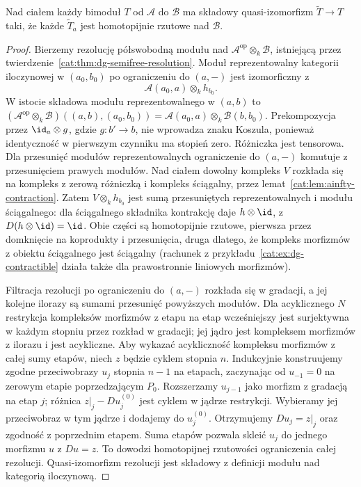 \begin{lemat}\label{cat:lem:morita-bimodule-resolution}
Nad ciałem każdy bimoduł $T$ od $\mathcal A$ do $\mathcal B$ ma składowy quasi-izomorfizm $\widetilde T\to T$ taki, że każde $\widetilde T_a$ jest homotopijnie rzutowe nad $\mathcal B$.
\end{lemat}
\begin{proof}
Bierzemy rezolucję półswobodną modułu nad $\mathcal A^{\mathrm{op}}\otimes_k\mathcal B$, istniejącą przez twierdzenie~\ref{cat:thm:dg-semifree-resolution}. Moduł reprezentowalny kategorii iloczynowej w $(a_0,b_0)$ po ograniczeniu do $(a,-)$ jest izomorficzny z
\[
 \mathcal A(a_0,a)\otimes_k h_{b_0}.
\]
W istocie składowa modułu reprezentowalnego w $(a,b)$ to $(\mathcal A^{\mathrm{op}}\otimes_k\mathcal B)((a,b),(a_0,b_0))=\mathcal A(a_0,a)\otimes_k\mathcal B(b,b_0)$. Prekompozycja przez $\id_a\otimes g$, gdzie $g:b'\to b$, nie wprowadza znaku Koszula, ponieważ identyczność w pierwszym czynniku ma stopień zero. Różniczka jest tensorowa. Dla przesunięć modułów reprezentowalnych ograniczenie do $(a,-)$ komutuje z przesunięciem prawych modułów. Nad ciałem dowolny kompleks $V$ rozkłada się na kompleks z zerową różniczką i kompleks ściągalny, przez lemat~\ref{cat:lem:ainfty-contraction}. Zatem $V\otimes_k h_{b_0}$ jest sumą przesuniętych reprezentowalnych i modułu ściągalnego: dla ściągalnego składnika kontrakcję daje $h\otimes\id$, z $D(h\otimes\id)=\id$. Obie części są homotopijnie rzutowe, pierwsza przez domknięcie na koprodukty i przesunięcia, druga dlatego, że kompleks morfizmów z obiektu ściągalnego jest ściągalny (rachunek z przykładu~\ref{cat:ex:dg-contractible} działa także dla prawostronnie liniowych morfizmów).

Filtracja rezolucji po ograniczeniu do $(a,-)$ rozkłada się w gradacji, a jej kolejne ilorazy są sumami przesunięć powyższych modułów. Dla acyklicznego $N$ restrykcja kompleksów morfizmów z etapu na etap wcześniejszy jest surjektywna w każdym stopniu przez rozkład w gradacji; jej jądro jest kompleksem morfizmów z ilorazu i jest acykliczne. Aby wykazać acykliczność kompleksu morfizmów z całej sumy etapów, niech $z$ będzie cyklem stopnia $n$. Indukcyjnie konstruujemy zgodne przeciwobrazy $u_j$ stopnia $n-1$ na etapach, zaczynając od $u_{-1}=0$ na zerowym etapie poprzedzającym $P_0$. Rozszerzamy $u_{j-1}$ jako morfizm z gradacją na etap $j$; różnica $z|_j-Du_j^{(0)}$ jest cyklem w jądrze restrykcji. Wybieramy jej przeciwobraz w tym jądrze i dodajemy do $u_j^{(0)}$. Otrzymujemy $Du_j=z|_j$ oraz zgodność z poprzednim etapem. Suma etapów pozwala skleić $u_j$ do jednego morfizmu $u$ z $Du=z$. To dowodzi homotopijnej rzutowości ograniczenia całej rezolucji. Quasi-izomorfizm rezolucji jest składowy z definicji modułu nad kategorią iloczynową.
\end{proof}

